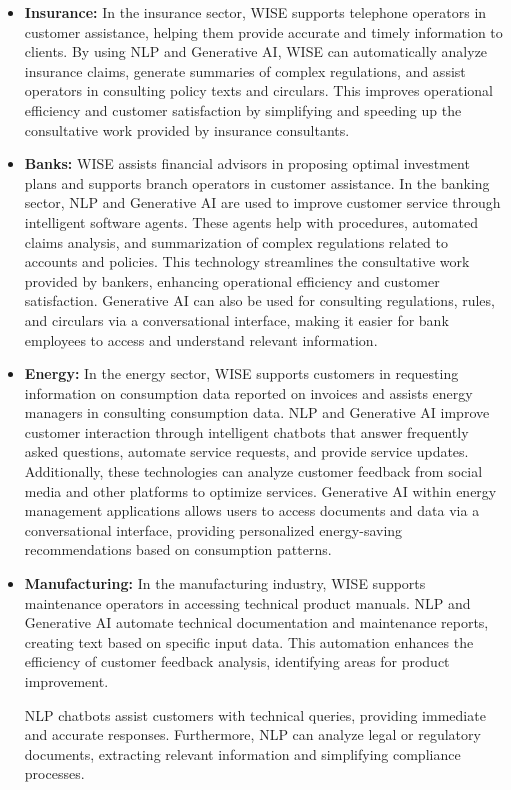 \begin{itemize}
    \item \textbf{Insurance:} In the insurance sector, WISE supports telephone operators in customer assistance, helping them provide accurate and timely information to clients. By using NLP and Generative AI, WISE can automatically analyze insurance claims, generate summaries of complex regulations, and assist operators in consulting policy texts and circulars. This improves operational efficiency and customer satisfaction by simplifying and speeding up the consultative work provided by insurance consultants.
    \item \textbf{Banks:} WISE assists financial advisors in proposing optimal investment plans and supports branch operators in customer assistance. In the banking sector, NLP and Generative AI are used to improve customer service through intelligent software agents. These agents help with procedures, automated claims analysis, and summarization of complex regulations related to accounts and policies. This technology streamlines the consultative work provided by bankers, enhancing operational efficiency and customer satisfaction.
    Generative AI can also be used for consulting regulations, rules, and circulars via a conversational interface, making it easier for bank employees to access and understand relevant information.
    \item \textbf{Energy:} In the energy sector, WISE supports customers in requesting information on consumption data reported on invoices and assists energy managers in consulting consumption data. NLP and Generative AI improve customer interaction through intelligent chatbots that answer frequently asked questions, automate service requests, and provide service updates. Additionally, these technologies can analyze customer feedback from social media and other platforms to optimize services.
    Generative AI within energy management applications allows users to access documents and data via a conversational interface, providing personalized energy-saving recommendations based on consumption patterns.
    \item \textbf{Manufacturing:} In the manufacturing industry, WISE supports maintenance operators in accessing technical product manuals. NLP and Generative AI automate technical documentation and maintenance reports, creating text based on specific input data. This automation enhances the efficiency of customer feedback analysis, identifying areas for product improvement.

    NLP chatbots assist customers with technical queries, providing immediate and accurate responses. Furthermore, NLP can analyze legal or regulatory documents, extracting relevant information and simplifying compliance processes.
\end{itemize}

